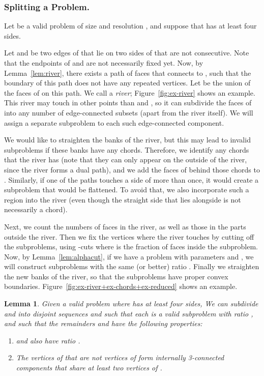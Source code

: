 \documentclass[11pt]{article}
\newtheorem {lemma} {Lemma}
\renewcommand{\subsection}[1]{\subsubsection{#1.}}
\begin{document}
  \subsection {Splitting a Problem} \label {sec:split}

    Let  be a valid problem of size  and resolution ,
    and suppose that  has at least four sides.

    Let  and  be two edges of  that lie on two sides of  that
    are not consecutive. Note that the endpoints of  and  are not
    necessarily fixed yet.
    Now, by Lemma~\ref {lem:river}, there exists a path of faces
    that connects  to , such that the boundary of this path does not
    have any repeated vertices. Let  be the union of the faces of  on
    this path. We call  a \emph {river}; Figure~\ref {fig:ex-river} shows
    an example.
    This river may touch  in other points than  and , so it can
    subdivide the faces of  into any number of edge-connected subsets
    (apart from the river itself). We will assign a separate subproblem to
    each such edge-connected component.

    We would like to straighten the banks of the river, but this may lead to
    invalid subproblems if these banks have any chords. Therefore, we identify
    any chords that the river has
    (note that they can only appear on the outside of the river, since the river forms a dual path),
    and we add the faces of  behind those chords to .
    Similarly,
    if one of the paths touches a side of  more than once, it would create a
    subproblem that would be flattened. To avoid that, we also incorporate such a
    region into the river (even though the straight side that lies alongside 
    is not necessarily a chord).

    Next, we count the numbers of faces in the river, as well as those
    in the parts outside the river. Then we fix the vertices where the river
    touches  by cutting off the subproblems, using -cuts where 
    is the fraction of faces inside the subproblem.
    Now, by Lemma~\ref {lem:alphacut},
    if we have a problem with parameters  and , we will
    construct subproblems with the same (or better) ratio .
    Finally we straighten the new
    banks of the river, so that the subproblems have proper
    convex boundaries. Figure~\ref {fig:ex-river+ex-chords+ex-reduced} shows
    an example.



    \begin {lemma} \label {lem:divide}
      Given a valid problem  where  has at least four sides,
      We can subdivide  and  into disjoint sequences 
      and  such that each  is a valid
      subproblem with ratio , and such that the remainders
       and  have
      the following properties:
      \begin {enumerate}
        \item  and  also have ratio .
        \item The vertices of  that are not vertices of
         form internally 3-connected components that
        share at least two vertices of         .
      \end {enumerate}
    \end {lemma}
\end{document}

